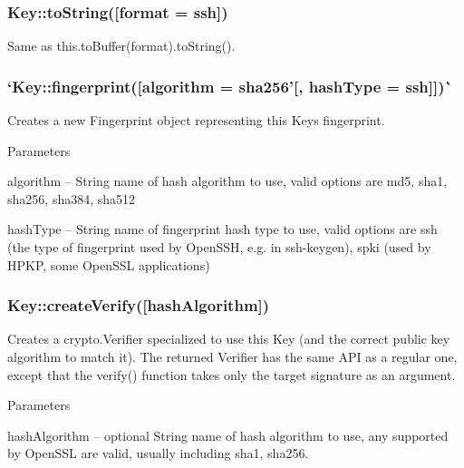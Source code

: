 \subsubsection*{{\ttfamily Key\+::to\+String(\mbox{[}format = \textquotesingle{}ssh\mbox{]})}}

Same as {\ttfamily this.\+to\+Buffer(format).to\+String()}.

\subsubsection*{`Key\+::fingerprint(\mbox{[}algorithm = \textquotesingle{}sha256'\mbox{[}, hash\+Type = \textquotesingle{}ssh\textquotesingle{}\mbox{]}\mbox{]})\`{}}

Creates a new {\ttfamily Fingerprint} object representing this Key\textquotesingle{}s fingerprint.

Parameters


\begin{DoxyItemize}
\item {\ttfamily algorithm} -- String name of hash algorithm to use, valid options are {\ttfamily md5}, {\ttfamily sha1}, {\ttfamily sha256}, {\ttfamily sha384}, {\ttfamily sha512}
\item {\ttfamily hash\+Type} -- String name of fingerprint hash type to use, valid options are {\ttfamily ssh} (the type of fingerprint used by Open\+S\+SH, e.\+g. in {\ttfamily ssh-\/keygen}), {\ttfamily spki} (used by H\+P\+KP, some Open\+S\+SL applications)
\end{DoxyItemize}

\subsubsection*{{\ttfamily Key\+::create\+Verify(\mbox{[}hash\+Algorithm\mbox{]})}}

Creates a {\ttfamily crypto.\+Verifier} specialized to use this Key (and the correct public key algorithm to match it). The returned Verifier has the same A\+PI as a regular one, except that the {\ttfamily verify()} function takes only the target signature as an argument.

Parameters


\begin{DoxyItemize}
\item {\ttfamily hash\+Algorithm} -- optional String name of hash algorithm to use, any supported by Open\+S\+SL are valid, usually including {\ttfamily sha1}, {\ttfamily sha256}.
\end{DoxyItemize}

